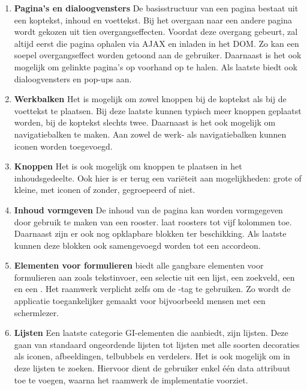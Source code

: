 \begin{enumerate}
\item \textbf{Pagina's en dialoogvensters}
De basisstructuur van een pagina bestaat uit een koptekst, inhoud en voettekst. 
Bij het overgaan naar een andere pagina wordt gekozen uit tien overgangseffecten. 
Voordat deze overgang gebeurt, zal \jqm{} altijd eerst die pagina ophalen via AJAX en inladen in het DOM. 
Zo kan een soepel overgangseffect worden getoond aan de gebruiker. 
Daarnaast is het ook mogelijk om gelinkte pagina's op voorhand op te halen. 
Als laatste biedt \jqm{} ook dialoogvensters en pop-ups aan. 

\item \textbf{Werkbalken}
Het is mogelijk om zowel knoppen bij de koptekst als bij de voettekst te plaatsen. 
Bij deze laatste kunnen typisch meer knoppen geplaatst worden, bij de koptekst slechts twee. 
Daarnaast is het ook mogelijk om navigatiebalken te maken. 
Aan zowel de werk- als navigatiebalken kunnen iconen worden toegevoegd.

\item \textbf{Knoppen}
Het is ook mogelijk om knoppen te plaatsen in het inhoudsgedeelte. 
Ook hier is er terug een variëteit aan mogelijkheden: grote of kleine, met iconen of zonder, gegroepeerd of niet. 

\item \textbf{Inhoud vormgeven}
De inhoud van de pagina kan worden vormgegeven door gebruik te maken van een rooster. 
\jqm{} laat roosters tot vijf kolommen toe. 
Daarnaast zijn er ook nog opklapbare blokken ter beschikking. 
Als laatste kunnen deze blokken ook samengevoegd worden tot een accordeon. 

\item \textbf{Elementen voor formulieren}
\jqm{} biedt alle gangbare elementen voor formulieren aan zoals tekstinvoer, een selectie uit een lijst, een zoekveld, een  en een . 
Het raamwerk verplicht zelfs om de -tag te gebruiken. 
Zo wordt de applicatie toegankelijker gemaakt voor bijvoorbeeld mensen met een schermlezer.

\item \textbf{Lijsten}
Een laatste categorie GI-elementen die \jqm{} aanbiedt, zijn lijsten. 
Deze gaan van standaard ongeordende lijsten tot lijsten met alle soorten decoraties als iconen, afbeeldingen, telbubbels en verdelers. 
Het is ook mogelijk om in deze lijsten te zoeken. 
Hiervoor dient de gebruiker enkel één data attribuut toe te voegen, waarna het raamwerk de implementatie voorziet. 
\end{enumerate}


